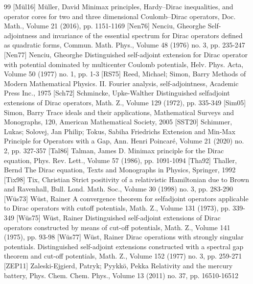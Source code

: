 \documentclass[10pt]{amsart}
\theoremstyle{definition}
\newcommand\1{{\ensuremath {\mathds 1} }}
\begin{document}
\begin{thebibliography}{99}
 [Mül16] Müller, David Minimax principles, Hardy–Dirac inequalities, and operator cores for two and three dimensional Coulomb–Dirac operators, Doc. Math., Volume 21 (2016), pp. 1151-1169
 [Nen76] Nenciu, Gheorghe Self-adjointness and invariance of the essential spectrum for Dirac operators defined as quadratic forms, Commun. Math. Phys., Volume 48 (1976) no. 3, pp. 235-247
 [Nen77] Nenciu, Gheorghe Distinguished self-adjoint extension for Dirac operator with potential dominated by multicenter Coulomb potentials, Helv. Phys. Acta, Volume 50 (1977) no. 1, pp. 1-3
 [RS75] Reed, Michael; Simon, Barry Methods of Modern Mathematical Physics. II. Fourier analysis, self-adjointness, Academic Press Inc., 1975
 [Sch72] Schmincke, Upke-Walther Distinguished selfadjoint extensions of Dirac operators, Math. Z., Volume 129 (1972), pp. 335-349
 [Sim05] Simon, Barry Trace ideals and their applications, Mathematical Surveys and Monographs, 120, American Mathematical Society, 2005
 [SST20] Schimmer, Lukas; Solovej, Jan Philip; Tokus, Sabiha Friedrichs Extension and Min-Max Principle for Operators with a Gap, Ann. Henri Poincaré, Volume 21 (2020) no. 2, pp. 327-357
 [Tal86] Talman, James D. Minimax principle for the Dirac equation, Phys. Rev. Lett., Volume 57 (1986), pp. 1091-1094
 [Tha92] Thaller, Bernd The Dirac equation, Texts and Monographs in Physics, Springer, 1992
 [Tix98] Tix, Christian Strict positivity of a relativistic Hamiltonian due to Brown and Ravenhall, Bull. Lond. Math. Soc., Volume 30 (1998) no. 3, pp. 283-290
 [Wüs73] Wüst, Rainer A convergence theorem for selfadjoint operators applicable to Dirac operators with cutoff potentials, Math. Z., Volume 131 (1973), pp. 339-349
 [Wüs75] Wüst, Rainer Distinguished self-adjoint extensions of Dirac operators constructed by means of cut-off potentials, Math. Z., Volume 141 (1975), pp. 93-98
 [Wüs77] Wüst, Rainer Dirac operations with strongly singular potentials. Distinguished self-adjoint extensions constructed with a spectral gap theorem and cut-off potentials, Math. Z., Volume 152 (1977) no. 3, pp. 259-271
 [ZEP11] Zaleski-Ejgierd, Patryk; Pyykkö, Pekka Relativity and the mercury battery, Phys. Chem. Chem. Phys., Volume 13 (2011) no. 37, pp. 16510-16512
\end{thebibliography}
\end{document}
